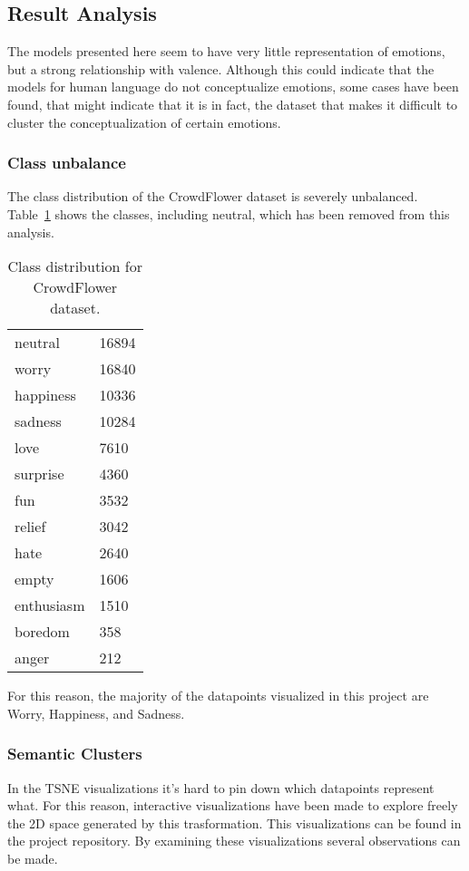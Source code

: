 \subsection{Result Analysis}\label{sub:Result Analysis}
The models presented here seem to have very little representation of emotions, but a strong relationship with valence. Although this could indicate that the models for human language do not conceptualize emotions, some cases have been found, that might indicate that it is in fact, the dataset that makes it difficult to cluster the conceptualization of certain emotions.

\subsubsection{Class unbalance}
The class distribution of the CrowdFlower dataset is severely unbalanced. Table~\ref{tab:CrowdFlower_distribution} shows the classes, including neutral, which has been removed from this analysis.

\begin{table}
    \centering
    \begin{tabular}{|l|l|}
    \hline
      neutral     &  16894 \\
      worry       &  16840 \\
      happiness   &  10336 \\
      sadness     &  10284 \\
      love        &   7610 \\
      surprise    &   4360 \\
      fun         &   3532 \\
      relief      &   3042 \\
      hate        &   2640 \\
      empty       &   1606 \\
      enthusiasm  &   1510 \\
      boredom     &    358 \\
      anger       &    212 \\
    \end{tabular}
    \caption{Class distribution for CrowdFlower dataset.}\label{tab:CrowdFlower_distribution}
\end{table}

For this reason, the majority of the datapoints visualized in this project are Worry, Happiness, and Sadness.

\subsubsection{Semantic Clusters}
In the TSNE visualizations it's hard to pin down which datapoints represent what. For this reason, interactive visualizations have been made to explore freely the 2D space generated by this trasformation. This visualizations can be found in the project repository. By examining these visualizations several observations can be made.

